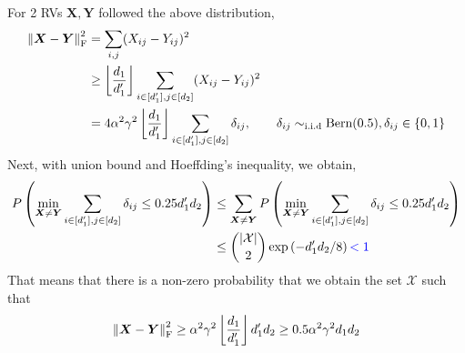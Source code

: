 \documentclass[10pt,xcolor={usenames,dvipsnames,table},aspectratio=169]{beamer}
\begin{document}
\begin{frame}
    For 2 RVs $\bm{X}, \bm{Y}$ followed the above distribution,
    \begin{align*}
    \left\lVert\bm{X} - \bm{Y}\right\rVert_{\rm F}^2 
    &= \sum_{i,j} (X_{ij} - Y_{ij})^2 \\
    &\geq \left \lfloor \dfrac{d_1}{d_1'}\right \rfloor \sum_{{i \in [d_1'], j\in [d_2]}} (X_{ij} - Y_{ij})^2  \\
    &= 4 \alpha^2 \gamma^2 \left \lfloor \dfrac{d_1}{d_1'}\right \rfloor \sum_{i \in [d_1'], j\in [d_2]} \delta_{ij} , \qquad  \delta_{ij} \sim_{\text{i.i.d}} \text{Bern}(0.5), \delta_{ij} \in \left\{0, 1\right\}
    \end{align*}
   Next, with union bound and Hoeffding's inequality, we obtain,
   \begin{align*}
   P \left( \min_{\bm{X} \neq \bm{Y}} \sum_{i \in [d_1'], j\in [d_2]} \delta_{ij} \leq 0.25 d_1' d_2\right) 
   &\leq \sum_{\bm{X} \neq \bm{Y}}  P \left( \min_{\bm{X} \neq \bm{Y}} \sum_{i \in [d_1'], j\in [d_2]} \delta_{ij} \leq 0.25 d_1' d_2\right)  \\
   &\leq {\left\lvert\mathcal{X}\right\rvert \choose 2} \exp \left( -d_1' d_2/8 \right) {\color{blue} < 1}
   \end{align*}
   That means that there is a non-zero probability that we obtain the set $\mathcal{X}$  such that
   \[
   \left\lVert\bm{X} - \bm{Y}\right\rVert_{\rm F}^2 \geq \alpha^2 \gamma^2\left \lfloor \dfrac{d_1}{d_1'}\right \rfloor d_1' d_2 \geq 0.5 \alpha^2 \gamma^2 d_1 d_2
   \] 

\end{frame}
\end{document}
